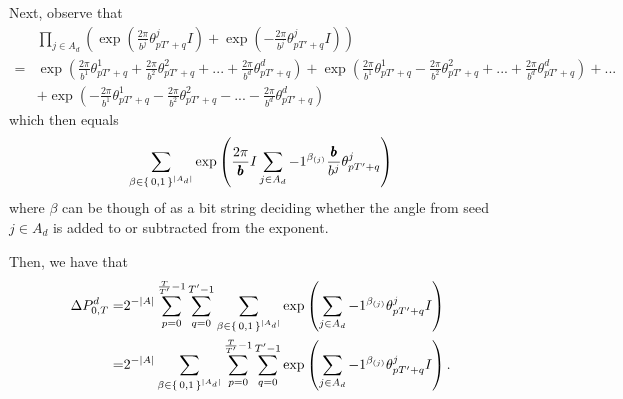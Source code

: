 \documentclass[11pt,titlepage]{article}
\newcommand{\rationalPeriod}{{T^j}'}
\newcommand{\rationalPeriodTotal}{{T}'}
\newcommand{\seedAngleJ}[2]{{\theta^{#2}_{#1}}}
\newcommand{\seedAngle}[1]{{\theta^j_{#1}}}
\newcommand{\totalPeriod}{T}
\newcommand{\numbToAngle}{\frac{2\pi}{b^j}}
\newcommand{\numbToAngleNoJ}[1]{\frac{2\pi}{b^{#1}}}
\newcommand{\changeTotalOneDim}{\Delta P_{0, T}^d}
\newcommand{\commonBase}{\pmb{b}}
\newcommand{\numbToCommon}{\frac{\commonBase}{b^j}}
\newcommand{\commonToAngle}{\frac{2\pi}{\commonBase}}
\begin{document}
\newcommand{\periodFrac}{\frac{\totalPeriod}{\rationalPeriod}}
\newcommand{\periodFracRational}{\frac{\rationalPeriodTotal}{\rationalPeriod}}

Next, observe that 
\begin{align*}
  &\prod_{j \in A_d} \left(
      \exp\left(\numbToAngle\seedAngle{p \rationalPeriodTotal + q} I\right) +  \exp\left(-\numbToAngle\seedAngle{p \rationalPeriodTotal + q} I\right)\right)\\
 =& 
  \exp(\numbToAngleNoJ{1}\seedAngleJ{p \rationalPeriodTotal + q}{1} + \numbToAngleNoJ{2}\seedAngleJ{p \rationalPeriodTotal + q}{2} + ... + \numbToAngleNoJ{d}\seedAngleJ{p \rationalPeriodTotal + q}{d}) 
  + \exp(\numbToAngleNoJ{1}\seedAngleJ{p \rationalPeriodTotal + q}{1} - \numbToAngleNoJ{2}\seedAngleJ{p \rationalPeriodTotal + q}{2} + ... + \numbToAngleNoJ{d}\seedAngleJ{p \rationalPeriodTotal + q}{d}) + ... \\
  &+ \exp(-\numbToAngleNoJ{1}\seedAngleJ{p \rationalPeriodTotal + q}{1} - \numbToAngleNoJ{2}\seedAngleJ{p \rationalPeriodTotal + q}{2} - ... - \numbToAngleNoJ{d}\seedAngleJ{p \rationalPeriodTotal + q}{d})
\end{align*}
which then equals
\begin{equation}
 \sum_{\beta \in \set{0,1}^{|A_d|}} 
    \exp\left(
      	\commonToAngle I
        \sum_{j \in A_d} -1 ^ {\beta_{(j)}}
          \numbToCommon \seedAngle{p \rationalPeriodTotal + q}
      \right)
\end{equation}
where $\beta$ can be though of as a bit string deciding whether the angle from seed
$j \in A_d$ is added to or subtracted from the exponent.

Then, we have that
\begin{align*}
 \changeTotalOneDim =&
  2^{-|A|} \sum_{p= 0}^{\frac{\totalPeriod}{\rationalPeriodTotal} - 1} \sum_{q = 0}^{\rationalPeriodTotal - 1}
 \sum_{\beta \in \set{0,1}^{|A_d|}} 
    \exp\left(
        \sum_{j \in A_d} -1 ^ {\beta_{(j)}}
        \seedAngle{p \rationalPeriodTotal + q}I
      \right)\\
 =&
  2^{-|A|} 
 \sum_{\beta \in \set{0,1}^{|A_d|}} 
     \sum_{p= 0}^{\frac{\totalPeriod}{\rationalPeriodTotal} - 1} \sum_{q = 0}^{\rationalPeriodTotal - 1}
    \exp\left(
        \sum_{j \in A_d} -1 ^ {\beta_{(j)}}
        \seedAngle{p \rationalPeriodTotal + q}I
      \right).
\end{align*}

\newcommand{\eqWTSInnerProd}{
  \sum_{p= 0}^{\frac{\totalPeriod}{\rationalPeriodTotal} - 1} \sum_{q = 0}^{\rationalPeriodTotal - 1}
    \exp\left(
        \sum_{j \in A_d} -1 ^ {\beta_{(j)}}
        \seedAngle{p \rationalPeriodTotal + q}I
      \right)}
\end{document}
